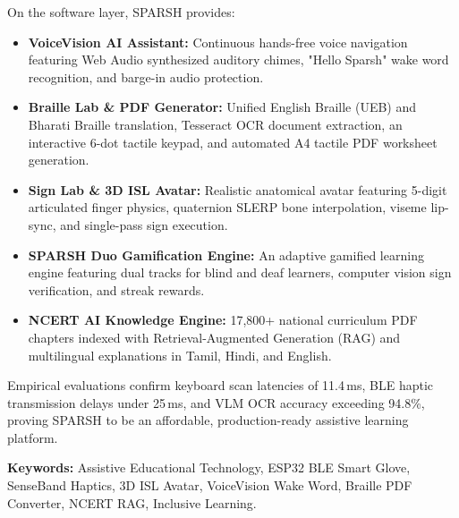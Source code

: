 \documentclass[12pt,a4paper]{report}
\begin{document}
On the software layer, SPARSH provides:
\begin{itemize}
    \item \textbf{VoiceVision AI Assistant:} Continuous hands-free voice navigation featuring Web Audio synthesized auditory chimes, "Hello Sparsh" wake word recognition, and barge-in audio protection.
    \item \textbf{Braille Lab \& PDF Generator:} Unified English Braille (UEB) and Bharati Braille translation, Tesseract OCR document extraction, an interactive 6-dot tactile keypad, and automated A4 tactile PDF worksheet generation.
    \item \textbf{Sign Lab \& 3D ISL Avatar:} Realistic anatomical avatar featuring 5-digit articulated finger physics, quaternion SLERP bone interpolation, viseme lip-sync, and single-pass sign execution.
    \item \textbf{SPARSH Duo Gamification Engine:} An adaptive gamified learning engine featuring dual tracks for blind and deaf learners, computer vision sign verification, and streak rewards.
    \item \textbf{NCERT AI Knowledge Engine:} 17,800+ national curriculum PDF chapters indexed with Retrieval-Augmented Generation (RAG) and multilingual explanations in Tamil, Hindi, and English.
\end{itemize}

Empirical evaluations confirm keyboard scan latencies of 11.4\,ms, BLE haptic transmission delays under 25\,ms, and VLM OCR accuracy exceeding 94.8\%, proving SPARSH to be an affordable, production-ready assistive learning platform.

\vspace{0.4cm}
\noindent \textbf{Keywords:} Assistive Educational Technology, ESP32 BLE Smart Glove, SenseBand Haptics, 3D ISL Avatar, VoiceVision Wake Word, Braille PDF Converter, NCERT RAG, Inclusive Learning.

\clearpage
\tableofcontents

\clearpage
\listoftables

\clearpage
{}
\setcounter{page}{1}

\end{document}
